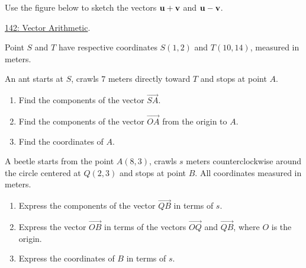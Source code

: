 \documentclass{ximera}
\begin{document}
\begin{question}  \label{Q343g0dce}
Use the figure below to sketch the vectors ${\bf u}+{\bf v}$ and ${\bf u} - {\bf v}$.

\href{https://www.geogebra.org/classic/xunxnnyh}{142: Vector Arithmetic}.

 
\begin{onlineOnly}
    \begin{center}
\end{center}
\end{onlineOnly}

\end{question}

\begin{question}  \label{QOKDlerdfsre}
Point $S$ and $T$ have respective coordinates $S(1,2)$ and $T(10,14)$, measured in meters.

An ant starts at $S$, crawls $7$ meters directly toward $T$ and stops at point $A$.

\begin{enumerate}
\item Find the components of the vector $\overrightarrow{SA}$.

\item Find the components of the vector $\overrightarrow{OA}$ from the origin to $A$.

\item Find the coordinates of $A$.
\end{enumerate}

\end{question}


\begin{question}  \label{QDfgegsE}
A beetle starts from the point $A(8,3)$, crawls $s$ meters counterclockwise around the circle centered at $Q(2,3)$ and stops at point $B$. All coordinates measured in meters.

\begin{enumerate}
\item Express the components of the vector $\overrightarrow{QB}$ in terms of $s$.

\item Express the vector $\overrightarrow{OB}$ in terms of the vectors $\overrightarrow{OQ}$ and $\overrightarrow{QB}$, where $O$ is the origin.

\item Express the coordinates of $B$ in terms of $s$.
\end{enumerate}
\end{question}
\end{document}
